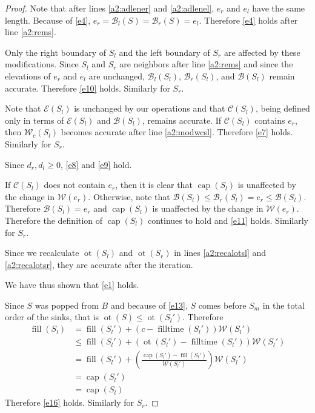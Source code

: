\documentclass[11pt,a4paper]{article}
\DeclareMathOperator{\capp}{cap}
\DeclareMathOperator{\ot}{ot}
\DeclareMathOperator{\Fill}{fill}
\DeclareMathOperator{\filltime}{filltime}
\begin{document}
\begin{proof}
Note that after lines \ref{a2:adlener} and \ref{a2:adlenel}, $e_r$ and $e_l$ have the same length.
Because of \ref{e4}, $e_r = \mathcal{B}_l(S) = \mathcal{B}_r(S) = e_l$.
Therefore \ref{e4} holds after line \ref{a2:rems}.

Only the right boundary of $S_l$ and the left boundary of $S_r$ are affected by these modifications.
Since $S_l$ and $S_r$ are neighbors after line \ref{a2:rems} and since the elevations of $e_r$ and $e_l$ are unchanged, $\mathcal{B}_l(S_l)$, $\mathcal{B}_r(S_l)$, and $\mathcal{B}(S_l)$ remain accurate.
Therefore \ref{e10} holds.
Similarly for $S_r$.

Note that $\mathcal{E}(S_l)$ is unchanged by our operations and that $\mathcal{C}(S_l)$, being defined only in terms of $\mathcal{E}(S_l)$ and $\mathcal{B}(S_l)$, remains accurate.
If $\mathcal{C}(S_l)$ contains $e_r$, then $\mathcal{W}_c(S_l)$ becomes accurate after line \ref{a2:modwcsl}.
Therefore \ref{e7} holds.
Similarly for $S_r$.

Since $d_r, d_l \ge 0$, \ref{e8} and \ref{e9} hold.

If $\mathcal{C}(S_l)$ does not contain $e_r$, then it is clear that $\capp(S_l)$ is unaffected by the change in $\mathcal{W}(e_r)$.
Otherwise, note that $\mathcal{B}(S_l) \le \mathcal{B}_r(S_l) = e_r \le \mathcal{B}(S_l)$.
Therefore $\mathcal{B}(S_l) = e_r$ and $\capp(S_l)$ is unaffected by the change in $\mathcal{W}(e_r)$.
Therefore the definition of $\capp(S_l)$ continues to hold and \ref{e11} holds.
Similarly for $S_r$.

Since we recalculate $\ot(S_l)$ and $\ot(S_r)$ in lines \ref{a2:recalotsl} and \ref{a2:recalotsr}, they are accurate after the iteration.

We have thus shown that \ref{e1} holds.

Since $S$ was popped from $B$ and because of \ref{e13}, $S$ comes before $S_m$ in the total order of the sinks, that is $\ot(S)\le\ot(S_l')$.
Therefore
\begin{align*}
    \Fill(S_l) &= \Fill(S_l') + (c-\filltime(S_l'))\mathcal{W}(S_l') \\
               &\le \Fill(S_l') + (\ot(S_l')-\filltime(S_l'))\mathcal{W}(S_l') \\
               &= \Fill(S_l') + \left(\frac{\capp(S_l') - \Fill(S_l')}{\mathcal{W}(S_l')}\right)\mathcal{W}(S_l') \\
               &= \capp(S_l') \\
               &= \capp(S_l)
\end{align*}
Therefore \ref{e16} holds.
Similarly for $S_r$.


\end{proof}
\end{document}
